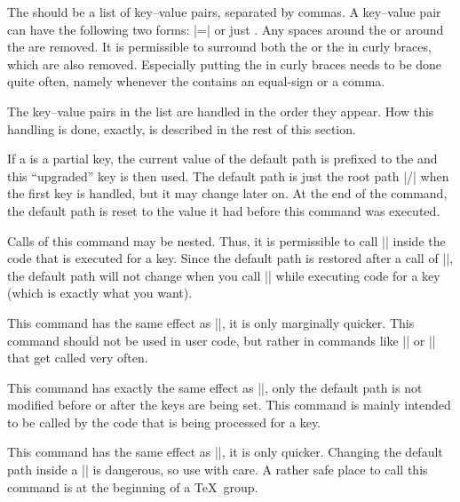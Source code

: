 \begin{command}{\pgfkeys{}}
    The  should be a list of key--value pairs, separated by
    commas. A key--value pair can have the following two forms:
    |=| or just . Any spaces around the
     or around the  are removed. It is permissible to
    surround both the  or the  in curly braces, which are
    also removed. Especially putting the  in curly braces needs to
    be done quite often, namely whenever the  contains an
    equal-sign or a comma.

    The key--value pairs in the list are handled in the order they appear. How
    this handling is done, exactly, is described in the rest of this section.

    If a  is a partial key, the current value of the default path is
    prefixed to the  and this ``upgraded'' key is then used. The
    default path is just the root path |/| when the first key is handled, but
    it may change later on. At the end of the command, the default path is
    reset to the value it had before this command was executed.

    Calls of this command may be nested. Thus, it is permissible to call
    |\pgfkeys| inside the code that is executed for a key. Since the default
    path is restored after a call of |\pgfkeys|, the default path will not
    change when you call |\pgfkeys| while executing code for a key (which is
    exactly what you want).
\end{command}

\begin{command}{\pgfqkeys{}}
    This command has the same effect as ||, it is only marginally quicker. This command
    should not be used in user code, but rather in commands like |\tikzset| or
    |\pgfset| that get called very often.
\end{command}

\begin{command}{\pgfkeysalso{}}
    This command has exactly the same effect as |\pgfkeys|, only the default
    path is not modified before or after the keys are being set. This command
    is mainly intended to be called by the code that is being processed for a
    key.
\end{command}

\begin{command}{\pgfqkeysalso{}}
    This command has the same effect as ||, it is only quicker. Changing the default
    path inside a |\pgfkeyalso| is dangerous, so use with care. A rather safe
    place to call this command is at the beginning of a \TeX\ group.
\end{command}


